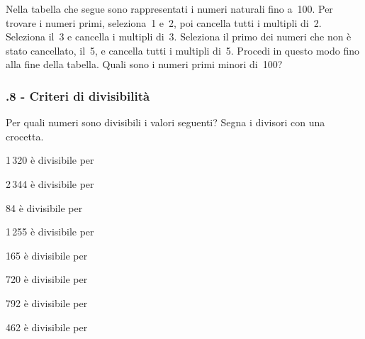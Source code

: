 \begin{esercizio}
\label{ese:1.16}
\begin{multicols}{2}
Nella tabella che segue sono rappresentati i numeri naturali fino a~100. Per trovare i
numeri primi, seleziona~1 e~2, poi cancella tutti i multipli di~2. Seleziona il~3 e cancella i multipli di~3. Seleziona il
primo dei numeri che non è stato cancellato, il~5, e cancella
tutti i multipli di~5. Procedi in questo modo fino alla fine
della tabella. Quali sono i numeri primi minori di~100?

\columnbreak\vfil

\end{multicols}
\end{esercizio}

\subsubsection*{\thechapter.8 - Criteri di divisibilità}
\begin{esercizio}
\label{ese:1.17}
 Per quali numeri sono divisibili i valori seguenti? Segna i divisori con una crocetta.
\TabPositions{3.5cm}
 \begin{enumeratea}
 \item 1\,320 è divisibile per \tab{}\:\:\:\:\:\:\:\:\:
 \item 2\,344 è divisibile per \tab{}\:\:\:\:\:\:\:\:\:
 \item 84 è divisibile per \tab{}\:\:\:\:\:\:\:\:\:
 \item 1\,255 è divisibile per \tab{}\:\:\:\:\:\:\:\:\:
 \item 165 è divisibile per \tab{}\:\:\:\:\:\:\:\:\:
 \item 720 è divisibile per \tab{}\:\:\:\:\:\:\:\:\:
 \item 792 è divisibile per \tab{}\:\:\:\:\:\:\:\:\:
 \item 462 è divisibile per \tab{}\:\:\:\:\:\:\:\:\:
 \end{enumeratea}
\end{esercizio}

